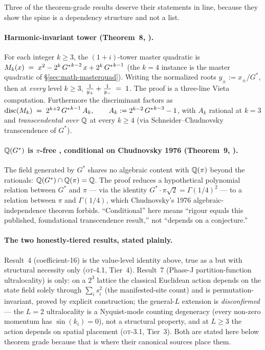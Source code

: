 Three of the theorem-grade results deserve their statements in line, because
they show the spine is a dependency structure and not a list.

\paragraph{Harmonic-invariant tower  (Theorem~8, ).}
For each integer $k\ge3$, the $(1+i)$-tower master quadratic is
$M_k(x) \;=\; x^{2} - 2^{k}\,{G^{*}}^{k-2}\,x + 2^{k}\,{G^{*}}^{k-1}$ (the $k=4$ instance is the master quadratic of
\S\ref{sec:math-masterquad}). Writing the normalized roots $y_\pm:=x_\pm/G^{*}$,
then at \emph{every} level $k\ge3$, $\frac{1}{y_+} + \frac{1}{y_-} \;=\; 1$. The proof is a three-line
Vieta computation. Furthermore the discriminant factors as $\operatorname{disc}(M_k) \;=\; 2^{k+2}\,{G^{*}}^{k-1}\,A_k, \qquad A_k := 2^{k-2}\,{G^{*}}^{k-3} - 1$, with
$A_k$ rational at $k=3$ and \emph{transcendental over $\mathbb{Q}$} at every $k\ge4$
(via Schneider--Chudnovsky transcendence of $G^{*}$).

\paragraph{$\mathbb{Q}(G^{*})$ is $\pi$-free , conditional on Chudnovsky 1976
(Theorem~9, ).} The field generated by $G^{*}$ shares no algebraic
content with $\mathbb{Q}(\pi)$ beyond the rationals:
$\mathbb{Q}(G^{*})\cap\mathbb{Q}(\pi)=\mathbb{Q}$. The proof reduces a hypothetical polynomial relation
between $G^{*}$ and $\pi$ --- via the identity $G^{*}\!\cdot\!\pi\sqrt2=\Gamma(1/4)^{2}$
--- to a relation between $\pi$ and $\Gamma(1/4)$, which Chudnovsky's 1976
algebraic-independence theorem forbids. ``Conditional'' here means ``rigour
equals this published, foundational transcendence result,'' not ``depends on a
conjecture.''

\paragraph{The two honestly-tiered results, stated plainly.} Result~4
(coefficient-16) is the value-level identity above, true as a  but
with structural necessity only  (\textsc{ot}-4.1, Tier~4).
Result~7 (Phase-J partition-function ultralocality) is 
only: on a $2^{3}$ lattice the classical Euclidean action depends on the state
field solely through $\sum_i s_i^{2}$ (the manifested-site count) and is
permutation-invariant, proved by explicit construction; the general-$L$
extension is \emph{disconfirmed} --- the $L=2$ ultralocality is a Nyquist-mode
counting degeneracy (every non-zero momentum has $\sin(k_i)=0$), not a
structural property, and at $L\ge3$ the action depends on spatial placement
(\textsc{ot}-3.1, Tier~3). Both are stated here below theorem grade because that
is where their canonical sources place them.

